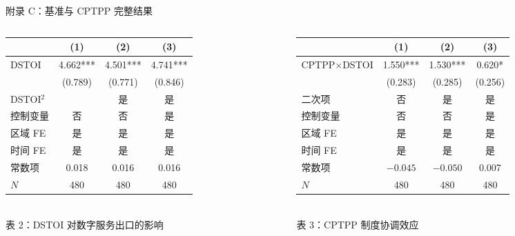 \documentclass[aspectratio=169,10pt]{ctexbeamer}
\begin{document}
\begin{frame}{附录 C：基准与 CPTPP 完整结果}
  \begin{columns}[T,totalwidth=\textwidth]
    \begin{column}{0.48\textwidth}
      \begin{table}
      \centering
      \scriptsize
      \begin{tabular}{lccc}
        \toprule
        & (1) & (2) & (3) \\
        \midrule
        DSTOI & 4.662*** & 4.501*** & 4.741*** \\
        & (0.789) & (0.771) & (0.846) \\
        DSTOI$^2$ &  & 是 & 是 \\
        控制变量 & 否 & 否 & 是 \\
        区域 FE & 是 & 是 & 是 \\
        时间 FE & 是 & 是 & 是 \\
        常数项 & 0.018 & 0.016 & 0.016 \\
        $N$ & 480 & 480 & 480 \\
        \bottomrule
      \end{tabular}
      {\scriptsize \\ 表 2：DSTOI 对数字服务出口的影响}
      \end{table}
    \end{column}
    \begin{column}{0.48\textwidth}
      \begin{table}
      \centering
      \scriptsize
      \begin{tabular}{lccc}
        \toprule
        & (1) & (2) & (3) \\
        \midrule
        CPTPP$\times$DSTOI & 1.550*** & 1.530*** & 0.620* \\
        & (0.283) & (0.285) & (0.256) \\
        二次项 & 否 & 是 & 是 \\
        控制变量 & 否 & 否 & 是 \\
        区域 FE & 是 & 是 & 是 \\
        时间 FE & 是 & 是 & 是 \\
        常数项 & $-0.045$ & $-0.050$ & 0.007 \\
        $N$ & 480 & 480 & 480 \\
        \bottomrule
      \end{tabular}
      {\scriptsize \\ 表 3：CPTPP 制度协调效应}
      \end{table}
    \end{column}
  \end{columns}
\end{frame}
\end{document}
